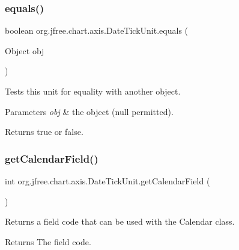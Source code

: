 \subsubsection{\texorpdfstring{equals()}{equals()}}
{\footnotesize\ttfamily boolean org.\+jfree.\+chart.\+axis.\+Date\+Tick\+Unit.\+equals (\begin{DoxyParamCaption}\item[{Object}]{obj }\end{DoxyParamCaption})}

Tests this unit for equality with another object.


\begin{DoxyParams}{Parameters}
{\em obj} & the object ({\ttfamily null} permitted).\\
\hline
\end{DoxyParams}
\begin{DoxyReturn}{Returns}
{\ttfamily true} or {\ttfamily false}. 
\end{DoxyReturn}
\mbox{\label{classorg_1_1jfree_1_1chart_1_1axis_1_1_date_tick_unit_a78ca2ba8ac19fcc2c7fc22c40a2b8c94}} 
\subsubsection{\texorpdfstring{get\+Calendar\+Field()}{getCalendarField()}}
{\footnotesize\ttfamily int org.\+jfree.\+chart.\+axis.\+Date\+Tick\+Unit.\+get\+Calendar\+Field (\begin{DoxyParamCaption}{ }\end{DoxyParamCaption})}

Returns a field code that can be used with the {\ttfamily Calendar} class.

\begin{DoxyReturn}{Returns}
The field code. 
\end{DoxyReturn}
\mbox{\label{classorg_1_1jfree_1_1chart_1_1axis_1_1_date_tick_unit_a0744fba018d03283041af7bf8c6809c8}} 
